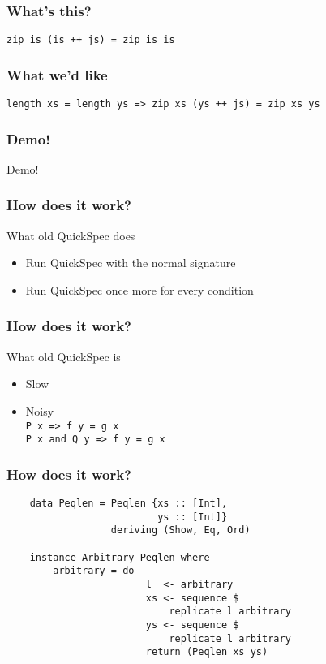 \documentclass{beamer}
\begin{document}
\begin{frame}
    \frametitle{What's this?}
    \Large{\centerline{\texttt{zip is (is ++ js) = zip is is}}}
\end{frame}

\begin{frame}
    \frametitle{What we'd like}
    \centerline{\texttt{length xs = length ys => zip xs (ys ++ js) = zip xs ys}}
\end{frame}

\begin{frame}
    \frametitle{Demo!}
    \Huge{\centerline{Demo!}}
\end{frame}

\begin{frame}
    \frametitle{How does it work?}
        What old QuickSpec does
        \begin{itemize}
            \item Run QuickSpec with the normal signature 
            \item Run QuickSpec once more for every condition 
        \end{itemize}
\end{frame}

\begin{frame}
    \frametitle{How does it work?}
        What old QuickSpec is
        \begin{itemize}
            \item Slow
            \item Noisy\\
                \texttt{P x => f y         = g x}\\
                \texttt{P x and Q y => f y = g x}
        \end{itemize}
\end{frame}

\begin{frame}[fragile]
    \frametitle{How does it work?}
    \begin{verbatim}
    data Peqlen = Peqlen {xs :: [Int],
                          ys :: [Int]}
                  deriving (Show, Eq, Ord)

    instance Arbitrary Peqlen where
        arbitrary = do
                        l  <- arbitrary 
                        xs <- sequence $
                            replicate l arbitrary
                        ys <- sequence $
                            replicate l arbitrary
                        return (Peqlen xs ys)
    \end{verbatim}
\end{frame}
\end{document}
